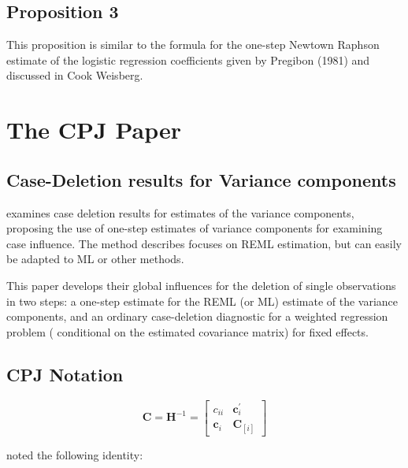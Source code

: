 \documentclass[Chap5amain.tex]{subfiles}
\begin{document}
\subsection{Proposition 3}
This proposition is similar to the formula for the one-step Newtown Raphson estimate of the logistic regression coefficients given by Pregibon (1981) and discussed in Cook Weisberg.



\newpage
\section{The CPJ Paper}%

\subsection{Case-Deletion results for Variance components}
\citet{CPJ} examines case deletion results for estimates of the variance components, proposing the use of one-step estimates of variance components for examining case influence. The method describes focuses on REML estimation, but can easily be adapted to ML or other methods.

This paper develops their global influences for the deletion of single observations in two steps: a one-step estimate for the REML (or ML) estimate of the variance components, and an ordinary case-deletion diagnostic for a weighted regression problem ( conditional on the estimated covariance matrix) for fixed effects.


\subsection{CPJ Notation} %

\[ \boldsymbol{C} = \boldsymbol{H}^{-1} = \left[
\begin{array}{cc}
c_{ii} & \boldsymbol{c}_{i}^{\prime}\\
\boldsymbol{c}_{i} &  \boldsymbol{C}_{[i]}
\end{array} \right]
\]

\citet{CPJ} noted the following identity:
\end{document}

